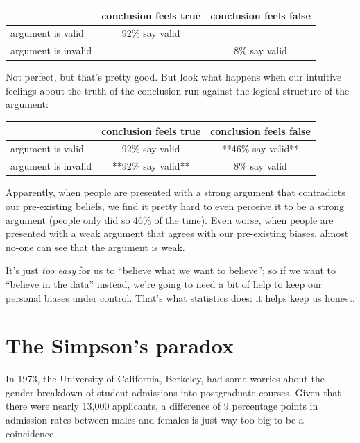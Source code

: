 \documentclass[
  11pt,
  a4paper,
  twoside,symmetric,openright]{book}
\theoremstyle{break}
\theoremstyle{break}
\begin{document}
\begin{table}[H]
\centering
\begin{tabular}{lcc}
\toprule
  & conclusion feels true & conclusion feels false\\
\midrule
argument is valid & 92\% say valid & \\
argument is invalid &  & 8\% say valid\\
\bottomrule
\end{tabular}
\end{table}

Not perfect, but that's pretty good. But look what happens when our intuitive feelings about the truth of the conclusion run against the logical structure of the argument:

\begin{table}[H]
\centering
\begin{tabular}{lcc}
\toprule
  & conclusion feels true & conclusion feels false\\
\midrule
argument is valid & 92\% say valid & **46\% say valid**\\
argument is invalid & **92\% say valid** & 8\% say valid\\
\bottomrule
\end{tabular}
\end{table}

Apparently, when people are presented with a strong argument that contradicts our pre-existing beliefs, we find it pretty hard to even perceive it to be a strong argument (people only did so 46\% of the time). Even worse, when people are presented with a weak argument that agrees with our pre-existing biases, almost no-one can see that the argument is weak.

It's just \emph{too easy} for us to ``believe what we want to believe''; so if we want to ``believe in the data'' instead, we're going to need a bit of help to keep our personal biases under control. That's what statistics does: it helps keep us honest.

\pagebreak[3]

\section{The Simpson's paradox}\label{the-simpsons-paradox}

In 1973, the University of California, Berkeley, had some worries about the gender breakdown of student admissions into postgraduate courses. Given that there were nearly 13,000 applicants, a difference of 9 percentage points in admission rates between males and females is just way too big to be a coincidence.
\end{document}
